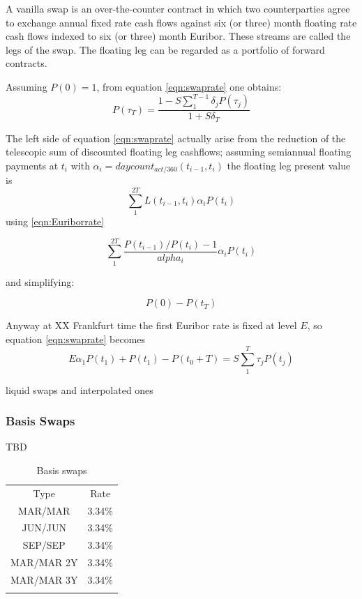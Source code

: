 \documentclass[11pt,reqno]{amsart}
\begin{document}
A vanilla swap is an over-the-counter contract in which two counterparties agree to exchange annual fixed rate cash flows against six (or three) month floating rate cash flows indexed to six (or three) month Euribor. These streams are called the legs of the swap. The floating leg can be regarded as a portfolio of forward contracts.

Assuming $P(0)=1$, from equation \ref{eqn:swaprate} one obtains:
\begin{equation}
P(\tau_T) = \frac
    {1 - S \sum_1^{T-1} \delta_j P(\tau_j)}
    {1+S \delta_T}
\label{eqn:discfromswaprate}
\end{equation}

The left side of equation \ref{eqn:swaprate} actually arise from the reduction of the telescopic sum of discounted floating leg cashflows; assuming semiannual floating payments at $t_i$ with $\alpha_i=daycount_{act/360}(t_{i-1},t_i) $ the floating leg present value is
\begin{equation}
\sum_1^{2T} L(t_{i-1},t_i) \alpha_i P(t_i)
\label{eqn:discfloatlegcf}
\end{equation}
using \ref{eqn:Euriborrate}

\begin{equation}
\sum_1^{2T} \frac{P(t_{i-1}) / P(t_i) - 1}{alpha_i} \alpha_i P(t_i)
\end{equation}

and simplifying:

\begin{equation}
P(0)-P(t_T)
\end{equation}

Anyway at XX Frankfurt time the first Euribor rate is fixed at level $E$, so equation \ref{eqn:swaprate} becomes
\begin{equation}
E \alpha_1 P(t_1) + P(t_1) - P(t_0+T) = S \sum_1^T \tau_j P(t_j)
\label{eqn:swapratewithfixingeffect}
\end{equation}


liquid swaps and interpolated ones


\subsubsection{\label{SecBasis}Basis Swaps}
TBD
\begin{table}[tbp]
\label{tab:basisSwaps}
\begin{tabular}{cc}
Type & Rate \\
MAR/MAR & 3.34\% \\
JUN/JUN & 3.34\% \\
SEP/SEP & 3.34\% \\
MAR/MAR 2Y & 3.34\% \\
MAR/MAR 3Y & 3.34\% \\
&
\end{tabular}%
\caption{Basis swaps}
\end{table}
\end{document}
